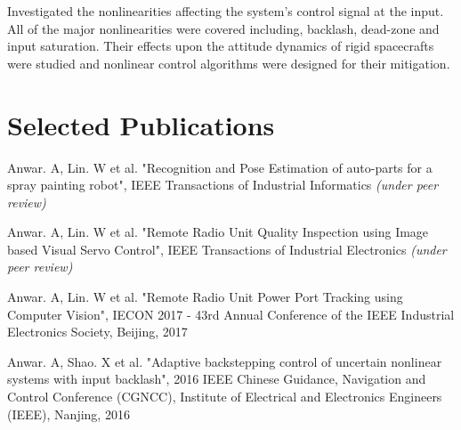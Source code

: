 \documentclass[a4paper]{deedy-resume} %
\begin{document}
\begin{minipage}[t]{0.66\textwidth}
Investigated the nonlinearities affecting the system's control signal at the input. All of the major nonlinearities were covered including, backlash, dead-zone and input saturation. Their effects upon the attitude dynamics of rigid spacecrafts were studied and nonlinear control algorithms were designed for their mitigation.

\sectionspace %


\section{Selected Publications}

\vspace{\topsep} %

\begin{tightitemize}
	\item Anwar. A, Lin. W et al. "Recognition and Pose Estimation of auto-parts for a spray painting robot", IEEE Transactions of Industrial Informatics \textit{(under peer review)}
	
	
	\item Anwar. A, Lin. W et al. "Remote Radio Unit Quality Inspection using Image based Visual Servo Control", IEEE Transactions of Industrial Electronics \textit{(under peer review)}
	
	\item Anwar. A, Lin. W et al. "Remote Radio Unit Power Port Tracking using Computer Vision", IECON 2017 - 43rd Annual Conference of the IEEE Industrial Electronics Society, Beijing, 2017
	
	\item Anwar. A, Shao. X et al. "Adaptive backstepping control of uncertain nonlinear systems with input backlash", 2016 IEEE Chinese Guidance, Navigation and Control Conference (CGNCC), Institute of Electrical and Electronics Engineers (IEEE), Nanjing, 2016
\end{tightitemize}



\end{minipage}
\end{document}
